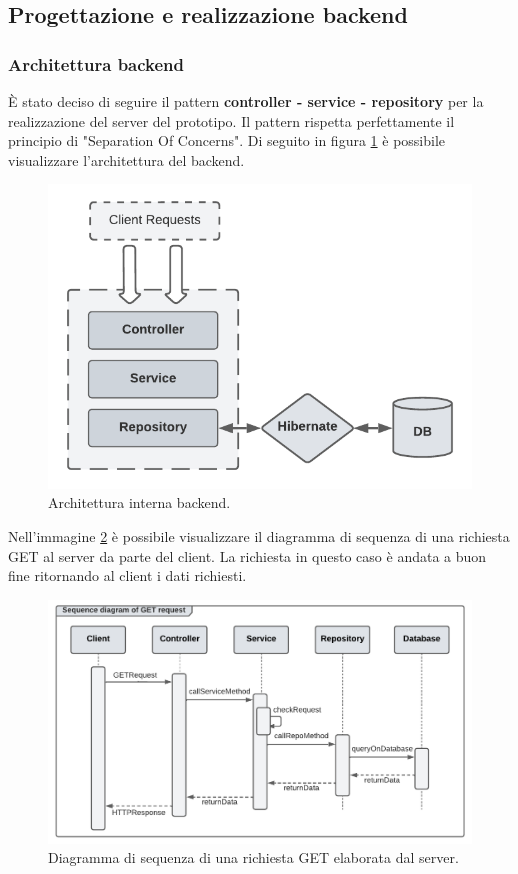 \subsection{Progettazione e realizzazione backend}
\subsubsection*{Architettura backend}
È stato deciso di seguire il pattern \textbf{controller - service - repository} per la realizzazione del server del prototipo.  Il pattern rispetta perfettamente il principio di "Separation Of Concerns". Di seguito in figura \ref{controller-service-repository} è possibile visualizzare l'architettura del backend.
\FloatBarrier
\begin{figure}[!h]
\centering
\includegraphics[width=0.8\linewidth]{immagini/controllerServiceRepository.pdf}
\caption{Architettura interna backend.}
\label{controller-service-repository}
\end{figure}
\FloatBarrier
Nell'immagine \ref{sequence-diagram} è possibile visualizzare il diagramma di sequenza di una richiesta GET al server da parte del client. La richiesta in questo caso è andata a buon fine ritornando al client i dati richiesti.
\FloatBarrier
\begin{figure}[!h]
\centering
\includegraphics[width=1\linewidth]{immagini/getRequestFromClient.pdf}
\caption{Diagramma di sequenza di una richiesta GET elaborata dal server.}
\label{sequence-diagram}
\end{figure}
